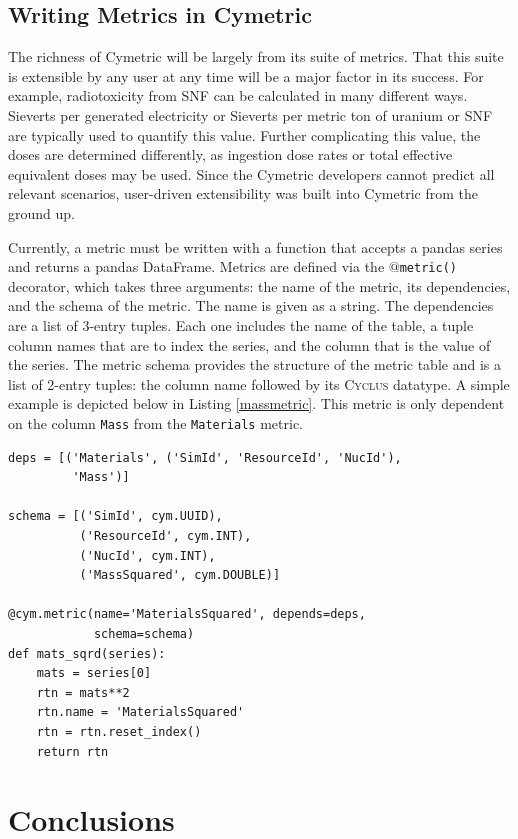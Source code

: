 \documentclass{anstrans}
\newcommand{\cyclus}{\textsc{Cyclus}\xspace}
\newcommand{\code}[1]{{\color{code}\texttt{#1}}}
\begin{document}
\subsection{Writing Metrics in Cymetric}
The richness of Cymetric will be largely from its suite of metrics. 
That this suite is extensible by any user at any time will be a major 
factor in its success. For example, radiotoxicity from \gls{SNF} can 
be calculated in many different ways. Sieverts per generated electricity 
or Sieverts per metric ton of uranium or \gls{SNF} are typically used to 
quantify this value. Further complicating this value, the doses are determined differently, as 
ingestion dose rates or total effective equivalent doses may be used. 
Since the Cymetric developers cannot predict all relevant scenarios, 
user-driven extensibility was built into Cymetric from the ground up. 

Currently, a metric must be written with a function that accepts a pandas 
series and returns a pandas DataFrame. Metrics are defined via the
\code{$@$metric()} decorator, which takes three arguments: the name of the 
metric, its dependencies, and the schema of the metric. 
The name is given as a string. The dependencies are a list of 3-entry tuples. 
Each one includes the name of the table, a tuple column names that are to 
index the series, and the column that is the value of the series. 
The metric schema provides the structure of the metric table and is a 
list of 2-entry tuples: the column name followed by its \cyclus datatype. 
A simple example is depicted below in Listing \ref{massmetric}. This metric 
is only dependent on the column \code{Mass} from the \code{Materials} metric. 

\begin{lstlisting}[caption ={Writing a Metric in Cymetric}, label=massmetric]
deps = [('Materials', ('SimId', 'ResourceId', 'NucId'), 
         'Mass')]

schema = [('SimId', cym.UUID), 
          ('ResourceId', cym.INT),
          ('NucId', cym.INT),  
          ('MassSquared', cym.DOUBLE)]

@cym.metric(name='MaterialsSquared', depends=deps, 
            schema=schema)
def mats_sqrd(series):
    mats = series[0]
    rtn = mats**2
    rtn.name = 'MaterialsSquared'
    rtn = rtn.reset_index()
    return rtn
\end{lstlisting}


\section{Conclusions}
\end{document}
